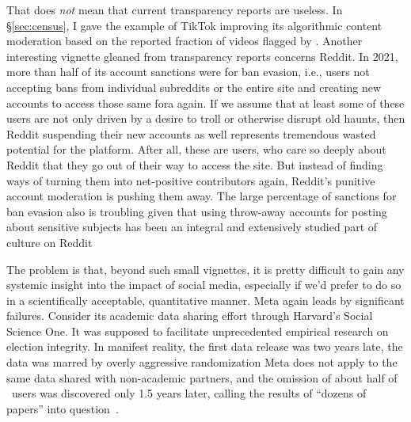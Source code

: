 That does \emph{not} mean that current transparency reports are useless. In
\S\ref{sec:census}, I gave the example of TikTok improving its algorithmic
content moderation based on the reported fraction of videos flagged by \AI.
Another interesting vignette gleaned from transparency reports concerns Reddit.
In 2021, more than half of its account sanctions were for ban evasion, i.e.,
users not accepting bans from individual subreddits or the entire site and
creating new accounts to access those same fora again. If we assume that at
least some of these users are not only driven by a desire to troll or otherwise
disrupt old haunts, then Reddit suspending their new accounts as well represents
tremendous wasted potential for the platform. After all, these are users, who
care so deeply about Reddit that they go out of their way to access the site.
But instead of finding ways of turning them into net-positive contributors
again, Reddit's punitive account moderation is pushing them away. The large
percentage of sanctions for ban evasion also is troubling given that using
throw-away accounts for posting about sensitive subjects has been an integral
and extensively studied part of culture on
Reddit~\cite{AmmariSchoenebeckea2019,AndalibiHaimsonea2016,ChoudhuryDe2014,Leavitt2015,PavalanathanDeChoudhury2015,SchradingOvesdotterAlmea2015,TreemLeonardi2013}

The problem is that, beyond such small vignettes, it is pretty difficult to gain
any systemic insight into the impact of social media, especially if we'd prefer
to do so in a scientifically acceptable, quantitative manner. Meta again leads
by significant failures. Consider its academic data sharing effort through
Harvard's Social Science One. It was supposed to facilitate unprecedented
empirical research on election integrity. In manifest reality, the first data
release was two years late, the data was marred by overly aggressive
randomization Meta does not apply to the same data shared with non-academic
partners, and the omission of about half of \US\ users was discovered only 1.5
years later, calling the results of ``dozens of papers'' into
question~\cite{Hegelich2020,HegelichMarcoea2020,Ingram2022,OHaraNelson2019,Timberg2021}.

